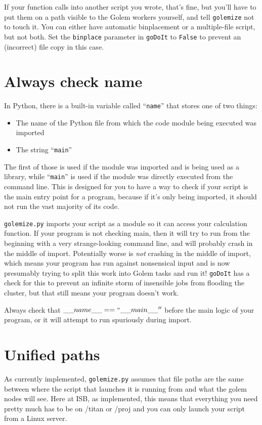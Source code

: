 \documentclass[11pt,ebook,oneside,final]{memoir} %
\begin{document}
If your function calls into another script you wrote, that's fine, but you'll have to put them on a path visible to the Golem workers yourself, and tell \texttt{golemize} not to touch it. You can either have automatic binplacement or a multiple-file script, but not both. Set the \texttt{binplace} parameter in \texttt{goDoIt} to \texttt{False} to prevent an (incorrect) file copy in this case.

\section{Always check \textunderscore\textunderscore{}name\textunderscore\textunderscore}
In Python, there is a built-in variable called ``\texttt{\textunderscore\textunderscore{}name\textunderscore\textunderscore{}}'' that stores one of two things:
\begin{itemize}
	\item The name of the Python file from which the code module being executed was imported
	\item The string ``\texttt{\textunderscore\textunderscore{}main\textunderscore\textunderscore}''
\end{itemize}
The first of those is used if the module was imported and is being used as a library, while ``\texttt{\textunderscore\textunderscore{}main\textunderscore\textunderscore}'' is used if the module was directly executed from the command line. This is designed for you to have a way to check if your script is the main entry point for a program, because if it's only being imported, it should not run the vast majority of its code.

\texttt{golemize.py} imports your script as a module so it can access your calculation function. If your program is not checking \textunderscore\textunderscore{}main\textunderscore\textunderscore, then it will try to run from the beginning with a very strange-looking command line, and will probably crash in the middle of import. Potentially worse is \emph{not} crashing in the middle of import, which means your program has run against nonsensical input and is now presumably trying to split this work into Golem tasks and run it! \texttt{goDoIt} has a check for this to prevent an infinite storm of insensible jobs from flooding the cluster, but that still means your program doesn't work.

Always check that $\_\_name\_\_ == ``\_\_main\_\_''$ before the main logic of your program, or it will attempt to run spuriously during import.
\section{Unified paths}
As currently implemented, \texttt{golemize.py} assumes that file paths are the same between where the script that launches it is running from and what the golem nodes will see. Here at ISB, as implemented, this means that everything you need pretty much has to be on /titan or /proj and you can only launch your script from a Linux server.
\end{document}
